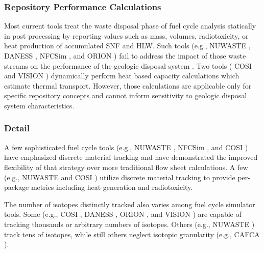 \subsubsection{Repository Performance Calculations}

Most current tools treat the waste disposal 
phase of fuel cycle analysis statically in post processing by reporting 
values such as mass, volumes, radiotoxicity, or heat production of accumulated 
\gls{SNF} and \gls{HLW}. Such tools 
(e.g.,
\gls{NUWASTE} \cite{abkowitz_nuclear_2010},
\gls{DANESS} \cite{yacout_daness_2011,van_den_durpel_daness:_2006}, 
\gls{NFCSim} \cite{schneider_nfcsim_2004}, and
ORION \cite{gregg_orion_2011}
) 
fail to address the impact of those waste streams on the performance of the 
geologic disposal system \cite{wilson_comparing_2011}.  Two tools (
\gls{COSI} \cite{boucher_international_2010} 
and 
\gls{VISION} \cite{yacout_vision_2006, wilson_comparing_2011, radel_repository_2007, boucher_international_2010}
) dynamically perform heat based capacity calculations which estimate thermal 
transport. However, those calculations are applicable only for specific 
repository concepts and cannot inform sensitivity to geologic disposal system characteristics.  

\subsubsection{Detail}

A few sophisticated fuel cycle tools  (e.g.,
\gls{NUWASTE} \cite{abkowitz_nuclear_2010},
\gls{NFCSim} \cite{schneider_nfcsim_2004}, and 
\gls{COSI} \cite{boucher_international_2010}) have emphasized discrete material 
tracking and have demonstrated the improved flexibility of that strategy over more 
traditional flow sheet calculations. A few (e.g., 
\gls{NUWASTE} \cite{abkowitz_nuclear_2010} and
\gls{COSI} \cite{boucher_international_2010}
) utilize discrete material tracking to 
provide per-package metrics including heat generation and radiotoxicity. 


The number of isotopes distinctly tracked also varies among fuel cycle 
simulator tools. Some (e.g., 
\gls{COSI} \cite{boucher_international_2010},
\gls{DANESS} \cite{yacout_daness_2011,van_den_durpel_daness:_2006}, 
ORION \cite{gregg_orion_2011}, and
\gls{VISION} \cite{yacout_vision_2006, wilson_comparing_2011, radel_repository_2007, boucher_international_2010}
) are capable of tracking thousands or arbitrary numbers of isotopes. Others (e.g., 
\gls{NUWASTE} \cite{abkowitz_nuclear_2010}) track tens of isotopes, while still 
others neglect isotopic granularity (e.g., 
\gls{CAFCA} \cite{guerin_impact_2009}).

